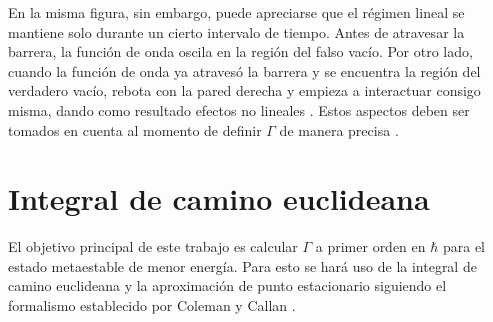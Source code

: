 En la misma figura, sin embargo, puede apreciarse que el régimen lineal se mantiene solo durante un cierto intervalo de tiempo. Antes de atravesar la barrera, la función de onda oscila en la región del falso vacío. 
Por otro lado, cuando la función de onda ya atravesó la barrera y se encuentra la región del verdadero vacío, rebota con la pared derecha y empieza a interactuar consigo misma, dando como resultado efectos no lineales \cite{Masoumi:2015psa}. Estos aspectos deben ser tomados en cuenta al momento de definir $\Gamma$ de manera precisa \cite{andreassen2017precision}. 



\section{Integral de camino euclideana}


El objetivo principal de este trabajo es calcular $\Gamma$ a primer orden en $\hbar$ para el estado metaestable de menor energía. Para esto se hará uso de la integral de camino euclideana y la aproximación de punto estacionario siguiendo el formalismo establecido por Coleman y Callan \cite{coleman1977fate, callan1977fate}. 

